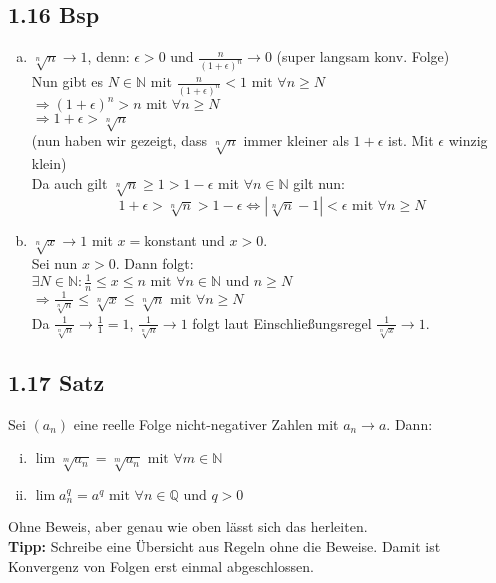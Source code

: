 \documentclass[12pt]{article}
\begin{document}
\subsection*{1.16 Bsp}
\begin{enumerate}[a)]
\item $\sqrt[n]{n} \rightarrow 1$, denn: $\epsilon > 0$ und $\frac{n}{(1+\epsilon)^n} \rightarrow 0$ (super langsam konv. Folge)\\
Nun gibt es $N \in \mathbb{N}$ mit $\frac{n}{(1+\epsilon)^n} < 1 \text{  mit  } \forall n \geq N$\\
$\Rightarrow (1 + \epsilon)^n > n \text{  mit  } \forall n \geq N$\\
$\Rightarrow 1 + \epsilon >  \sqrt[n]{n}$\\
(nun haben wir gezeigt, dass  $\sqrt[n]{n}$ immer kleiner als $1 + \epsilon$ ist. Mit $\epsilon $ winzig klein)\\
Da auch gilt  $\sqrt[n]{n} \geq 1 > 1- \epsilon$ mit $\forall n \in \mathbb{N}$ gilt nun:\\
$$ 1+ \epsilon >  \sqrt[n]{n} > 1- \epsilon \Leftrightarrow | \sqrt[n]{n}  -1 | < \epsilon \text{  mit  } \forall n \geq N$$
\item $\sqrt[n]{x} \rightarrow 1 $ mit $x=$konstant und $x>0$.\\
Sei nun $x > 0$. Dann folgt:\\
 $\exists N \in \mathbb{N} : \frac{1}{n} \leq  x \leq n \text{  mit  } \forall n \in \mathbb{N} \text{ und } n \geq N$ \\
$\Rightarrow \frac{1}{\sqrt[n]{n}} \leq \sqrt[n]{x} \leq \sqrt[n]{n} \text{  mit  } \forall n \geq N$\\
Da $\frac{1}{\sqrt[n]{n}} \rightarrow \frac{1}{1} = 1$, $\frac{1}{\sqrt[n]{n}} \rightarrow 1$ folgt laut Einschließungsregel $\frac{1}{\sqrt[n]{x}} \rightarrow 1$. 
\end{enumerate}

\subsection*{1.17 Satz}
Sei $(a_n)$ eine reelle Folge nicht-negativer Zahlen mit $a_n \rightarrow a$. Dann:

\begin{enumerate}[i)]
\item $\lim \sqrt[m]{a_n} = \sqrt[m]{a_n} \text{  mit  } \forall m \in \mathbb{N}$\\
\item $\lim a_n ^q = a^q \text{  mit } \forall n \in \mathbb{Q} \text{ und } q>0$
\end{enumerate}
Ohne Beweis, aber genau wie oben lässt sich das herleiten.\\
\textbf{Tipp:} Schreibe eine Übersicht aus Regeln ohne die Beweise. Damit ist Konvergenz von Folgen erst einmal abgeschlossen. 
\end{document}
